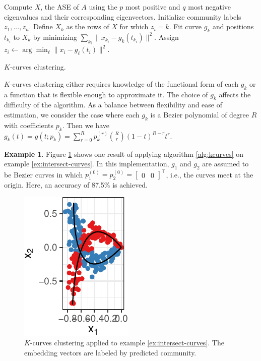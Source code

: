 \documentclass[
  11pt,
]{article}
\theoremstyle{definition}
\theoremstyle{definition}
\newtheorem{example}{Example}[section]
\theoremstyle{definition}
\theoremstyle{definition}
\theoremstyle{remark}
\begin{document}
\begin{algorithm}[h]
\label{alg:kcurves}
\DontPrintSemicolon
\SetAlgoLined
{}
Compute $X$, the ASE of $A$ using the $p$ most positive and $q$ most negative eigenvalues and their corresponding eigenvectors.\;
Initialize community labels $z_1, ..., z_n$.\;
 {
 {
Define $X_k$ as the rows of $X$ for which $z_i = k$.\;
Fit curve $g_k$ and positions $t_{k_i}$ to $X_k$ by minimizing $\sum_{k_i} \|x_{k_i} - g_k(t_{k_i})\|^2$.\;
}
 {
Assign $z_i \leftarrow \arg\min_\ell \|x_i - g_\ell(t_i)\|^2$.\;
}
}
\caption{$K$-curves clustering.}
\end{algorithm}

\(K\)-curves clustering either requires knowledge of the functional form of each \(g_k\) or a function that is flexible enough to approximate it.
The choice of \(g_k\) affects the difficulty of the algorithm.
As a balance between flexibility and ease of estimation, we consider the case where each \(g_k\) is a Bezier polynomial of degree \(R\) with coefficients \(p_k\).
Then we have \(g_k(t) = g(t; p_k) = \sum_{r=0}^R p_k^{(r)} \binom{R}{r} (1-t)^{R-r} t^r\).

\begin{example}
\label{ex:intersect-curves-fit}
Figure \ref{fig:intersect-curves-2} shows one result of applying algorithm \ref{alg:kcurves} on example \ref{ex:intersect-curves}. 
In this implementation, $g_1$ and $g_2$ are assumed to be Bezier curves in which $p_1^{(0)} = p_2^{(0)} = \begin{bmatrix} 0 & 0 \end{bmatrix}^\top$, i.e., the curves meet at the origin. 
Here, an accuracy of 87.5\% is achieved. 

\begin{figure}[H]

{\centering \includegraphics{draft_files/figure-latex/intersect-curves-2-1} 

}

\caption{$K$-curves clustering applied to example \ref{ex:intersect-curves}. The embedding vectors are labeled by predicted community.}\label{fig:intersect-curves-2}
\end{figure}
\end{example}
\end{document}
